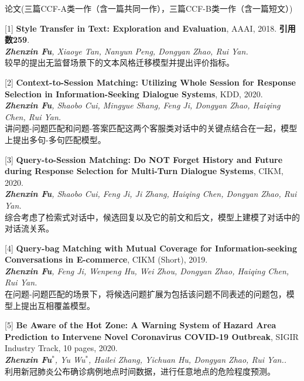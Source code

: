 \documentclass{resume} %
\begin{document}
\vspace{-0.2cm}
\begin{rSection}{论文(三篇CCF-A类一作（含一篇共同一作），三篇CCF-B类一作（含一篇短文）)}

    [1] \textbf{Style Transfer in Text: Exploration and Evaluation}, AAAI, 2018. \textbf{引用数259}.\\
    {\it \textbf{Zhenxin Fu}, Xiaoye Tan, Nanyun Peng, Dongyan Zhao, Rui Yan.} \\
    较早的提出无监督场景下的文本风格迁移模型并提出评价指标。
    \vspace{-0.1cm}
  
    [2] \textbf{Context-to-Session Matching: Utilizing Whole Session for Response Selection in Information-Seeking Dialogue Systems}, KDD, 2020. \\
    {\it \textbf{Zhenxin Fu}, Shaobo Cui, Mingyue Shang, Feng Ji, Dongyan Zhao, Haiqing Chen, Rui Yan.} \\
    讲问题-问题匹配和问题-答案匹配这两个客服类对话中的关键点结合在一起，模型上提出多句-多句匹配模型。
    \vspace{-0.1cm}

    [3] \textbf{Query-to-Session Matching: Do NOT Forget History and Future during Response Selection for Multi-Turn Dialogue Systems}, CIKM, 2020. \\
    {\it \textbf{Zhenxin Fu}, Shaobo Cui, Feng Ji, Ji Zhang, Haiqing Chen, Dongyan Zhao, Rui Yan.}\\
    综合考虑了检索式对话中，候选回复以及它的前文和后文，模型上建模了对话中的对话流关系。
    \vspace{-0.1cm}
    
    [4] \textbf{Query-bag Matching with Mutual Coverage for Information-seeking Conversations in E-commerce}, CIKM (Short), 2019. \\
    {\it \textbf{Zhenxin Fu}, Feng Ji, Wenpeng Hu, Wei Zhou, Dongyan Zhao, Haiqing Chen, Rui Yan.}\\
    在问题-问题匹配的场景下，将候选问题扩展为包括该问题不同表述的问题包，模型上提出互相覆盖模型。
    \vspace{-0.1cm}

    [5] \textbf{Be Aware of the Hot Zone: A Warning System of Hazard Area Prediction to Intervene Novel Coronavirus COVID-19 Outbreak}, SIGIR Industry Track, 10 pages, 2020. \\
    {\it \textbf{Zhenxin Fu}$^*$, Yu Wu$^*$, Hailei Zhang, Yichuan Hu, Dongyan Zhao, Rui Yan..}\\
    利用新冠肺炎公布确诊病例地点时间数据，进行任意地点的危险程度预测。
    \vspace{-0.1cm}


\end{rSection}
\end{document}
